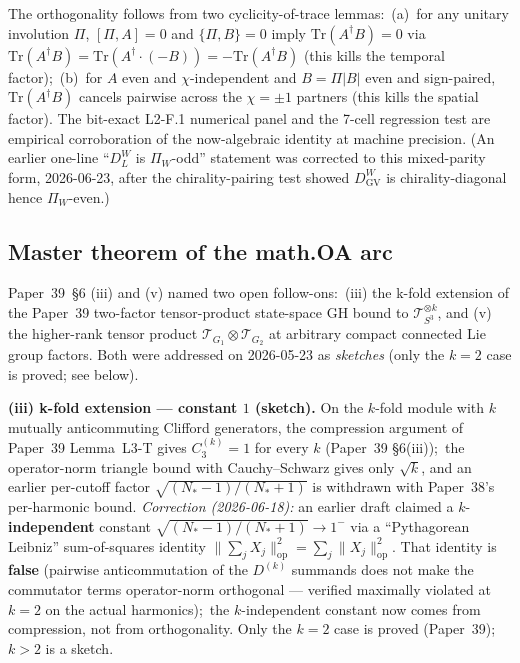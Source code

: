 \documentclass[11pt,a4paper]{article}
\theoremstyle{plain}
\theoremstyle{definition}
\newcommand{\sthree}{S^{3}}
\newcommand{\DGV}{D_{\mathrm{GV}}}
\newcommand{\DL}{D_{L}}
\newcommand{\Tcal}{\mathcal{T}}
\newcommand{\opnorm}[1]{\lVert #1 \rVert_{\mathrm{op}}}
\newcommand{\Tr}{\mathrm{Tr}}
\newcommand{\gvc}[2]{#2}
\begin{document}
The orthogonality follows from two cyclicity-of-trace lemmas:\
(a)~for any unitary involution $\Pi$, $[\Pi, A] = 0$ and
$\{\Pi, B\} = 0$ imply $\Tr(A^{\dagger} B) = 0$ via
$\Tr(A^{\dagger} B) = \Tr(A^{\dagger} \cdot (-B)) = -\Tr(A^{\dagger} B)$
(this kills the temporal factor);\ (b)~for $A$ even and
$\chi$-independent and $B = \Pi|B|$ even and sign-paired,
$\Tr(A^{\dagger} B)$ cancels pairwise across the $\chi = \pm1$ partners
(this kills the spatial factor).  The bit-exact L2-F.1 numerical panel
and the 7-cell regression test are empirical corroboration of the
now-algebraic identity at machine precision.  (An earlier one-line ``$\DL^{W}$ is $\Pi_{W}$-odd''
statement was corrected to this mixed-parity form, 2026-06-23, after the
chirality-pairing test showed $\DGV^{W}$ is chirality-diagonal hence
$\Pi_{W}$-even.)

\subsection{Master theorem of the math.OA arc}
\label{sec:closures_master_theorem}

Paper~39~\S 6 (iii) and (v) named two open follow-ons:\ (iii) the
k-fold extension of the Paper~39 two-factor tensor-product state-space GH bound
to $\Tcal_{\sthree}^{\otimes k}$, and (v) the higher-rank tensor product
$\Tcal_{G_{1}} \otimes \Tcal_{G_{2}}$ at arbitrary compact connected
Lie group factors.  Both were addressed on 2026-05-23 as \emph{sketches} (only the $k=2$ case is proved; see below).

\textbf{(iii) k-fold extension --- constant $1$ (sketch).}  On the
$k$-fold module with $k$ mutually anticommuting Clifford generators, \gvc{lipschitz-c3-compression}{the
compression argument of Paper~39 Lemma~L3-T gives $C_{3}^{(k)} = 1$ for
every $k$} (Paper~39 \S6(iii));\ the operator-norm triangle bound with
Cauchy--Schwarz gives only $\sqrt k$, and an earlier per-cutoff factor
$\sqrt{(N_*-1)/(N_*+1)}$ is withdrawn with Paper~38's per-harmonic
bound. \emph{Correction
(2026-06-18):} an earlier draft claimed a $k$-\textbf{independent}
constant $\sqrt{(N_*-1)/(N_*+1)}\to1^-$ via a ``Pythagorean Leibniz''
sum-of-squares identity $\opnorm{\sum_j X_j}^2=\sum_j\opnorm{X_j}^2$.
That identity is \textbf{false} (pairwise anticommutation of the
$D^{(k)}$ summands does not make the commutator terms operator-norm
orthogonal --- verified maximally violated at $k=2$ on the actual
harmonics);\ the $k$-independent constant now comes from compression,
not from orthogonality. Only the $k=2$ case is proved (Paper~39);\ $k>2$
is a sketch.
\end{document}
